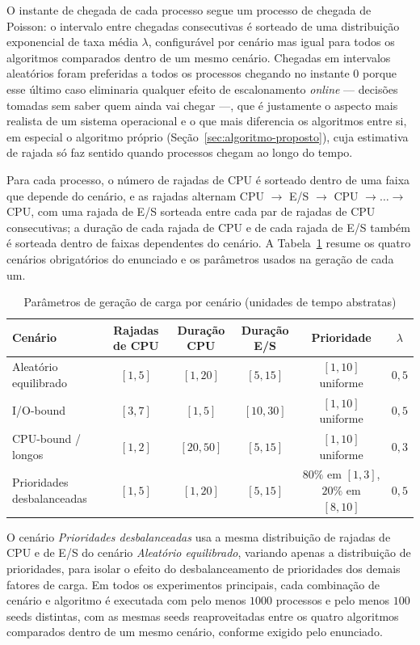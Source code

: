 \documentclass[conference]{IEEEtran}
\begin{document}
O instante de chegada de cada processo segue um processo de chegada de Poisson: o intervalo entre chegadas consecutivas é sorteado de uma distribuição exponencial de taxa média $\lambda$, configurável por cenário mas igual para todos os algoritmos comparados dentro de um mesmo cenário. Chegadas em intervalos aleatórios foram preferidas a todos os processos chegando no instante $0$ porque esse último caso eliminaria qualquer efeito de escalonamento \textit{online} — decisões tomadas sem saber quem ainda vai chegar —, que é justamente o aspecto mais realista de um sistema operacional e o que mais diferencia os algoritmos entre si, em especial o algoritmo próprio (Seção~\ref{sec:algoritmo-proposto}), cuja estimativa de rajada só faz sentido quando processos chegam ao longo do tempo.

Para cada processo, o número de rajadas de CPU é sorteado dentro de uma faixa que depende do cenário, e as rajadas alternam CPU $\rightarrow$ E/S $\rightarrow$ CPU $\rightarrow \dots \rightarrow$ CPU, com uma rajada de E/S sorteada entre cada par de rajadas de CPU consecutivas; a duração de cada rajada de CPU e de cada rajada de E/S também é sorteada dentro de faixas dependentes do cenário. A Tabela~\ref{tab:cenarios} resume os quatro cenários obrigatórios do enunciado e os parâmetros usados na geração de cada um.

\begin{table}[t]
\centering
\caption{Parâmetros de geração de carga por cenário (unidades de tempo abstratas)}
\label{tab:cenarios}
\begin{tabular}{lccccc}
\hline
\textbf{Cenário} & \textbf{Rajadas de CPU} & \textbf{Duração CPU} & \textbf{Duração E/S} & \textbf{Prioridade} & \textbf{$\lambda$} \\
\hline
Aleatório equilibrado & $[1,5]$ & $[1,20]$ & $[5,15]$ & $[1,10]$ uniforme & $0{,}5$ \\
I/O-bound & $[3,7]$ & $[1,5]$ & $[10,30]$ & $[1,10]$ uniforme & $0{,}5$ \\
CPU-bound / longos & $[1,2]$ & $[20,50]$ & $[5,15]$ & $[1,10]$ uniforme & $0{,}3$ \\
Prioridades desbalanceadas & $[1,5]$ & $[1,20]$ & $[5,15]$ & $80\%$ em $[1,3]$, $20\%$ em $[8,10]$ & $0{,}5$ \\
\hline
\end{tabular}
\end{table}

O cenário \textit{Prioridades desbalanceadas} usa a mesma distribuição de rajadas de CPU e de E/S do cenário \textit{Aleatório equilibrado}, variando apenas a distribuição de prioridades, para isolar o efeito do desbalanceamento de prioridades dos demais fatores de carga. Em todos os experimentos principais, cada combinação de cenário e algoritmo é executada com pelo menos $1000$ processos e pelo menos $100$ seeds distintas, com as mesmas seeds reaproveitadas entre os quatro algoritmos comparados dentro de um mesmo cenário, conforme exigido pelo enunciado.
\end{document}
